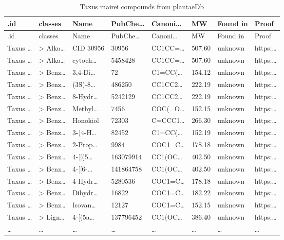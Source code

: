 \documentclass[
]{article}
\begin{document}
\begin{longtable}[]{@{}llllllll@{}}
\caption{\label{tab:Taxus-mairei-compounds-from-plantaeDb}Taxus mairei compounds from plantaeDb}\tabularnewline
\toprule
.id & classes & Name & PubChe\ldots{} & Canoni\ldots{} & MW & Found in & Proof\tabularnewline
\midrule
\endfirsthead
\toprule
.id & classes & Name & PubChe\ldots{} & Canoni\ldots{} & MW & Found in & Proof\tabularnewline
\midrule
\endhead
Taxus \ldots{} & \textgreater{} Alka\ldots{} & CID 30956 & 30956 & CC1CC=\ldots{} & 507.60 & unknown & https:\ldots{}\tabularnewline
Taxus \ldots{} & \textgreater{} Alka\ldots{} & cytoch\ldots{} & 5458428 & CC1CC=\ldots{} & 507.60 & unknown & https:\ldots{}\tabularnewline
Taxus \ldots{} & \textgreater{} Benz\ldots{} & 3,4-Di\ldots{} & 72 & C1=CC(\ldots{} & 154.12 & unknown & https:\ldots{}\tabularnewline
Taxus \ldots{} & \textgreater{} Benz\ldots{} & (3S)-8\ldots{} & 486250 & CC1CC2\ldots{} & 222.19 & unknown & https:\ldots{}\tabularnewline
Taxus \ldots{} & \textgreater{} Benz\ldots{} & 8-Hydr\ldots{} & 5242129 & CC1CC2\ldots{} & 222.19 & unknown & https:\ldots{}\tabularnewline
Taxus \ldots{} & \textgreater{} Benz\ldots{} & Methyl\ldots{} & 7456 & COC(=O\ldots{} & 152.15 & unknown & https:\ldots{}\tabularnewline
Taxus \ldots{} & \textgreater{} Benz\ldots{} & Honokiol & 72303 & C=CCC1\ldots{} & 266.30 & unknown & https:\ldots{}\tabularnewline
Taxus \ldots{} & \textgreater{} Benz\ldots{} & 3-(4-H\ldots{} & 82452 & C1=CC(\ldots{} & 152.19 & unknown & https:\ldots{}\tabularnewline
Taxus \ldots{} & \textgreater{} Benz\ldots{} & 2-Prop\ldots{} & 9984 & COC1=C\ldots{} & 178.18 & unknown & https:\ldots{}\tabularnewline
Taxus \ldots{} & \textgreater{} Benz\ldots{} & 4-{[}{[}(5\ldots{} & 163079914 & CC1(OC\ldots{} & 402.50 & unknown & https:\ldots{}\tabularnewline
Taxus \ldots{} & \textgreater{} Benz\ldots{} & 4-{[}{[}6-\ldots{} & 141864758 & CC1(OC\ldots{} & 402.50 & unknown & https:\ldots{}\tabularnewline
Taxus \ldots{} & \textgreater{} Benz\ldots{} & 4-Hydr\ldots{} & 5280536 & COC1=C\ldots{} & 178.18 & unknown & https:\ldots{}\tabularnewline
Taxus \ldots{} & \textgreater{} Benz\ldots{} & Dihydr\ldots{} & 16822 & COC1=C\ldots{} & 182.22 & unknown & https:\ldots{}\tabularnewline
Taxus \ldots{} & \textgreater{} Benz\ldots{} & Isovan\ldots{} & 12127 & COC1=C\ldots{} & 152.15 & unknown & https:\ldots{}\tabularnewline
Taxus \ldots{} & \textgreater{} Lign\ldots{} & 4-{[}(5a\ldots{} & 137796452 & CC1(OC\ldots{} & 386.40 & unknown & https:\ldots{}\tabularnewline
\ldots{} & \ldots{} & \ldots{} & \ldots{} & \ldots{} & \ldots{} & \ldots{} & \ldots{}\tabularnewline
\bottomrule
\end{longtable}
\end{document}
